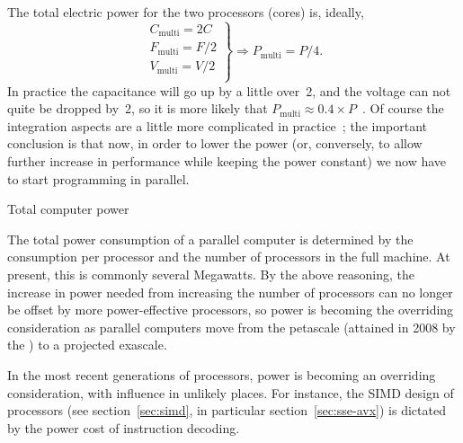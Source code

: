 The total electric power for the two processors (cores) is, ideally,
\[ \left.
\begin{array}{c}
C_{\mathrm{multi}} = 2C\\
F_{\mathrm{multi}} = F/2\\
V_{\mathrm{multi}} = V/2\\
\end{array}\right\} \Rightarrow
P_{\mathrm{multi}} = P/4.
\]
In practice the capacitance will go up by a little over~2, and the voltage can not quite be dropped by~2,
so it is more likely that $P_{\mathrm{multi}} \approx 0.4\times P$~\cite{Chandrakasa:transformations}.
Of course the integration aspects are a little more complicated in practice~\cite{Bohr:ISSCC2009};
the important conclusion is that now, in order to lower the power (or, conversely, to allow
further increase in performance while keeping the power constant) we now have to start programming 
in parallel.

 {Total computer power}

The total power consumption of a parallel computer is determined by
the consumption per processor and the number of processors in the full
machine. At present, this is commonly several Megawatts. By the above
reasoning, the increase in power needed from increasing the number of
processors can no longer be offset by more power-effective processors,
so power is becoming the overriding consideration as parallel
computers move from the petascale (attained in 2008 by the
) to a projected exascale.

In the most recent generations of processors, power is becoming an
overriding consideration, with influence in unlikely places. For
instance, the \ac{SIMD} design of processors (see
section~\ref{sec:simd}, in particular section~\ref{sec:sse-avx}) is
dictated by the power cost of instruction decoding.
